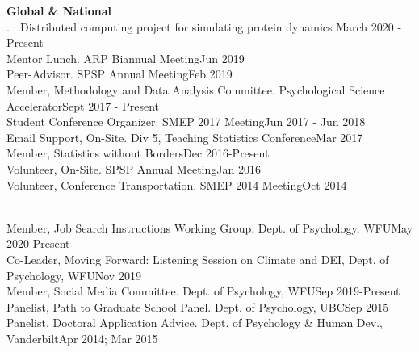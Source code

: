 {\large \textbf{Global \& National}}\smallskip\\
. : Distributed computing project for simulating protein dynamics \hfill{March 2020 - Present}\smallskip\\
Mentor Lunch. ARP Biannual Meeting\hfill{Jun 2019}\smallskip\\
Peer-Advisor. SPSP Annual Meeting\hfill{Feb 2019}\smallskip\\
Member, Methodology and Data Analysis Committee. Psychological Science Accelerator\hfill{Sept 2017 - Present}\smallskip\\
Student Conference Organizer. SMEP 2017 Meeting\hfill{Jun 2017 - Jun 2018}\smallskip\\
Email Support, On-Site. Div 5, Teaching Statistics Conference\hfill{Mar 2017}\smallskip\\
Member, Statistics without Borders\hfill{Dec 2016-Present}\smallskip\\
Volunteer, On-Site. SPSP Annual Meeting\hfill{Jan 2016}\smallskip\\
Volunteer, Conference Transportation. SMEP 2014 Meeting\hfill{Oct 2014}\medskip\\
%
%
\begin{minipage}{\linewidth}\smallskip\\
Member, Job Search Instructions Working Group. Dept. of Psychology, WFU\hfill {May 2020-Present}\smallskip\\
Co-Leader, Moving Forward: Listening Session on Climate and DEI, Dept. of Psychology, WFU\hfill {Nov 2019}\smallskip\\
Member, Social Media Committee. Dept. of Psychology, WFU\hfill {Sep 2019-Present}\smallskip\\
Panelist, Path to Graduate School Panel. Dept. of Psychology, UBC\hfill {Sep 2015}\smallskip\\
Panelist, Doctoral Application Advice. Dept. of Psychology \& Human Dev., Vanderbilt\hfill {Apr 2014; Mar 2015}\vspace{1.1mm}\end{minipage}\smallskip\\

